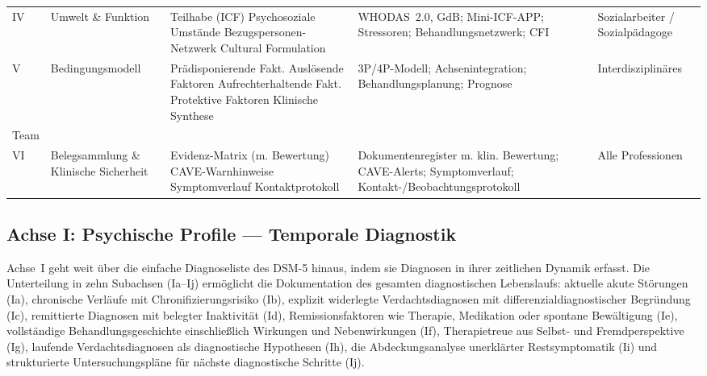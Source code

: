 \documentclass[11pt,a4paper]{article}
\begin{document}
\begin{table}[H]
\begin{tabularx}{\textwidth}{@{}L{0.8cm}L{2.1cm}L{3.3cm}Y L{2.2cm}@{}}
\addlinespace
IV & Umwelt \& Funktion & Teilhabe (ICF) \newline Psychosoziale Umst\"ande \newline Bezugspersonen-Netzwerk \newline Cultural Formulation & WHODAS~2.0, GdB; Mini-ICF-APP; Stressoren; Behandlungsnetzwerk; CFI & Sozialarbeiter / Sozialp\"adagoge \\
\addlinespace
V & Bedingungsmodell & Pr\"adisponierende Fakt. \newline Ausl\"osende Faktoren \newline Aufrechterhaltende Fakt. \newline Protektive Faktoren \newline Klinische Synthese & 3P/4P-Modell; Achsen\-integration; Behandlungs\-planung; Prognose & Interdisziplin\"ares\\Team \\
\addlinespace
VI & Belegsammlung \& Klinische Sicherheit & Evidenz-Matrix (m. Bewertung) \newline CAVE-Warnhinweise \newline Symptomverlauf \newline Kontaktprotokoll & Dokumentenregister m. klin. Bewertung; CAVE-Alerts; Symptomverlauf; Kontakt-/Beobachtungs\-protokoll & Alle Professionen \\
\bottomrule
\end{tabularx}
\normalsize
\end{table}

\subsection{Achse I: Psychische Profile --- Temporale Diagnostik}
\label{sec:achse1}

Achse~I geht weit \"uber die einfache Diagnoseliste des DSM-5 hinaus, indem sie Diagnosen in ihrer zeitlichen Dynamik erfasst. Die Unterteilung in zehn Subachsen (Ia--Ij) erm\"oglicht die Dokumentation des gesamten diagnostischen Lebenslaufs: aktuelle akute St\"orungen (Ia), chronische Verl\"aufe mit Chronifizierungsrisiko (Ib), explizit widerlegte Verdachtsdiagnosen mit differenzialdiagnostischer Begr\"undung (Ic), remittierte Diagnosen mit belegter Inaktivit\"at (Id), Remissionsfaktoren wie Therapie, Medikation oder spontane Bew\"altigung (Ie), vollst\"andige Behandlungsgeschichte einschlie\ss{}lich Wirkungen und Nebenwirkungen (If), Therapietreue aus Selbst- und Fremdperspektive (Ig), laufende Verdachtsdiagnosen als diagnostische Hypothesen (Ih), die Abdeckungsanalyse unerkl\"arter Restsymptomatik (Ii) und strukturierte Untersuchungspl\"ane f\"ur n\"achste diagnostische Schritte (Ij).
\end{document}
